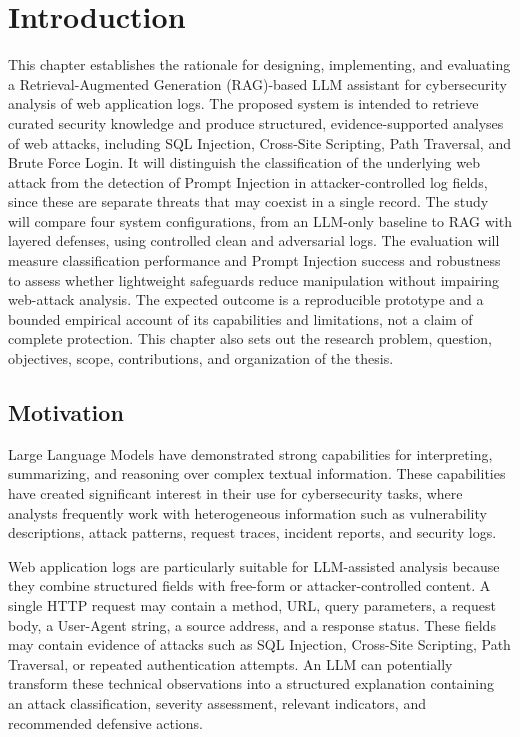 \chapter{Introduction}\label{introduction}

This chapter establishes the rationale for designing, implementing, and
evaluating a Retrieval-Augmented Generation (RAG)-based LLM assistant for
cybersecurity analysis of web application logs. The proposed system is
intended to retrieve curated security knowledge and produce structured,
evidence-supported analyses of web attacks, including SQL Injection,
Cross-Site Scripting, Path Traversal, and Brute Force Login. It will
distinguish the classification of the underlying web attack from the
detection of Prompt Injection in attacker-controlled log fields, since
these are separate threats that may coexist in a single record. The study
will compare four system configurations, from an LLM-only baseline to RAG
with layered defenses, using controlled clean and adversarial logs. The
evaluation will measure classification performance and Prompt Injection
success and robustness to assess whether lightweight safeguards reduce
manipulation without impairing web-attack analysis. The expected outcome
is a reproducible prototype and a bounded empirical account of its
capabilities and limitations, not a claim of complete protection. This
chapter also sets out the research problem, question, objectives, scope,
contributions, and organization of the thesis.

\section{Motivation}\label{motivation}

Large Language Models have demonstrated strong capabilities for
interpreting, summarizing, and reasoning over complex textual
information. These capabilities have created significant interest in
their use for cybersecurity tasks, where analysts frequently work with
heterogeneous information such as vulnerability descriptions, attack
patterns, request traces, incident reports, and security logs.

Web application logs are particularly suitable for LLM-assisted analysis
because they combine structured fields with free-form or
attacker-controlled content. A single HTTP request may contain a method,
URL, query parameters, a request body, a User-Agent string, a source
address, and a response status. These fields may contain evidence of
attacks such as SQL Injection, Cross-Site Scripting, Path Traversal, or
repeated authentication attempts. An LLM can potentially transform these
technical observations into a structured explanation containing an
attack classification, severity assessment, relevant indicators, and
recommended defensive actions.

